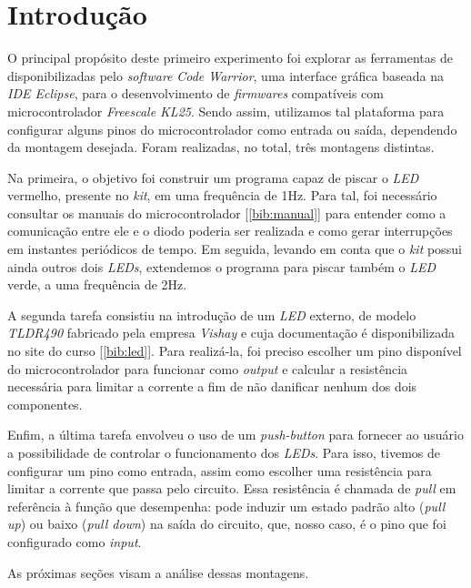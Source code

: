 \section {Introdução}

O principal propósito deste primeiro experimento foi explorar as ferramentas de
disponibilizadas pelo \textit{software} \textit{Code Warrior}, uma interface
gráfica baseada na \textit{IDE Eclipse}, para o desenvolvimento de
\textit{firmwares} compatíveis com microcontrolador \textit{Freescale KL25}.
Sendo assim, utilizamos tal plataforma para configurar alguns pinos do
microcontrolador como entrada ou saída, dependendo da montagem desejada. Foram
realizadas, no total, três montagens distintas.

\vspace{12pt}

Na primeira, o objetivo foi construir um programa capaz de piscar o \textit{LED}
vermelho, presente no \textit{kit}, em uma frequência de 1Hz. Para tal, foi
necessário consultar os manuais do microcontrolador [\ref{bib:manual}] para
entender como a comunicação entre ele e o diodo poderia ser realizada e como gerar interrupções
em instantes periódicos de tempo. Em seguida, levando em conta que o
\textit{kit} possui ainda outros dois \textit{LEDs}, extendemos o programa para piscar
também o \textit{LED} verde, a uma frequência de 2Hz.

\vspace{12pt}

A segunda tarefa consistiu na introdução de um \textit{LED} externo, de
modelo \textit{TLDR490} fabricado pela empresa \textit{Vishay} e cuja
documentação é disponibilizada no site do curso [\ref{bib:led}]. Para
realizá-la, foi preciso escolher um pino disponível do microcontrolador para funcionar como
\textit{output} e calcular a resistência necessária para limitar a corrente a
fim de não danificar nenhum dos dois componentes.

\vspace{12pt}

Enfim, a última tarefa envolveu o uso de um \textit{push-button} para fornecer
ao usuário a possibilidade de controlar o funcionamento dos \textit{LEDs}. Para
isso, tivemos de configurar um pino como entrada, assim como escolher
uma resistência para limitar a corrente que passa pelo circuito. Essa
resistência é chamada de \textit{pull} em referência à função que desempenha:
pode induzir um estado padrão alto (\textit{pull up}) ou baixo (\textit{pull
down}) na saída do circuito, que, nosso caso, é o pino que foi configurado como
\textit{input}.

\vspace{12pt}

As próximas seções visam a análise dessas montagens.